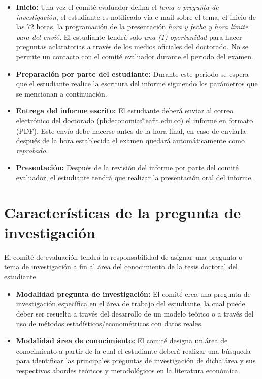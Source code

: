 \begin{itemize}
    \item \textbf{Inicio:} Una vez el comité evaluador defina el \emph{tema o pregunta de investigación}, el estudiante es notificado vía e-mail sobre el tema, el inicio de las 72 horas, la programación de la presentación \emph{hora y fecha y hora límite para del envió}. El estudiante tendrá solo \emph{una (1) oportunidad} para hacer preguntas aclaratorias a través de los medios oficiales del doctorado. No se permite un contacto con el comité evaluador durante el periodo del examen.
    \item \textbf{Preparación por parte del estudiante:} Durante este periodo se espera que el estudiante realice la escritura del informe siguiendo los parámetros que se mencionan a continuación. 
    \item \textbf{Entrega del informe escrito:} El estudiante deberá enviar al correo electrónico del doctorado (\href{mailto:phdeconomia@eafit.edu.co}{phdeconomia@eafit.edu.co}) el informe en formato (PDF). Este envío debe hacerse antes de la hora final, en caso de enviarla después de la hora establecida el examen quedará automáticamente como \emph{reprobado}.
    \item \textbf{Presentación:} Después de la revisión del informe por parte del comité evaluador, el estudiante tendrá que realizar la presentación oral del informe.
\end{itemize}

\section{Características de la pregunta de investigación}

El comité de evaluación tendrá la responsabilidad de asignar una pregunta o tema de investigación a fin al área del conocimiento de la tesis doctoral del estudiante
\begin{itemize}
    \item \textbf{Modalidad pregunta de investigación:} El comité crea una pregunta de investigación específica en el área de trabajo del estudiante, la cual puede deber ser resuelta a través del desarrollo de un modelo teórico o a través del uso de métodos estadísticos/econométricos con datos reales.
    \item \textbf{Modalidad área de conocimiento:} El comité designa un área de conocimiento a partir de la cual el estudiante deberá realizar una búsqueda para identificar las principales preguntas de investigación de dicha área y sus respectivos abordes teóricos y metodológicos en la literatura económica.
\end{itemize}

